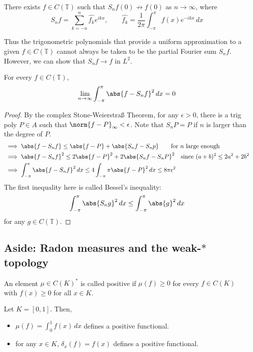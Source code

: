 \documentclass{article}
\begin{document}
\begin{eg}
    There exists $f \in C(\mathbb{T})$ such that $S_nf(0) \not\to f(0)$ as $n \to \infty$, where
    \begin{equation*}
        S_nf = \sum_{k = -n}^{n} \hat{f_k} e^{i k x}, \qquad \hat{f_k} = \frac{1}{2\pi} \int_{-\pi}^{\pi} f(x) e^{-i k x} \, dx
    \end{equation*}
\end{eg}

Thus the trigonometric polynomials that provide a uniform approximation to a given $f \in C(\mathbb{T})$ cannot always be taken to be the partial Fourier sum $S_nf$.
However, we can show that $S_nf \to f$ in $L^2$.
\begin{prop}
    For every $f \in C(\mathbb{T})$,
    \begin{equation*}
        \lim_{n \to \infty} \int_{-\pi}^\pi \abs{f - S_nf}^2 \, dx = 0
    \end{equation*}
\end{prop}
\begin{proof}
    By the complex Stone-Weierstra{\ss} Theorem, for any $\epsilon > 0$, there is a trig poly $P \in A$ such that $\norm{f-P}_\infty < \epsilon$.
    Note that $S_n P = P$ if $n$ is larger than the degree of $P$.
    \begin{align*}
        &\implies \abs{f - S_n f} \leq \abs{f - P} + \abs{S_n f - S_n p} \qquad \text{for $n$ large enough}\\
        &\implies \abs{f - S_n f}^2 \leq 2\abs{f - P}^2 + 2 \abs{S_n f - S_n P}^2 \quad \text{since } (a+b)^2 \leq 2a^2 + 2b^2 \\
        &\implies \int_{-\pi}^{\pi} \abs{f - S_n f}^2 \, dx \leq 4 \int_{-\pi}{\pi} \abs{f - P}^2 \, dx \leq 8 \pi \epsilon^2
    \end{align*}
    The first inequality here is called Bessel's inequality:
    \begin{equation*}
        \int_{-\pi}^\pi \abs{S_n g}^2 \, dx \leq \int_{-\pi}^\pi \abs{g}^2 \, dx
    \end{equation*}
    for any $g \in C(\mathbb{T})$.
\end{proof}

\subsection{Aside: Radon measures and the weak-$*$ topology}
\begin{defi}
    An element $\mu \in C(K)^*$ is called positive if $\mu(f) \geq 0$ for every $f \in C(K)$ with $f(x) \geq 0$ for all $x \in K$.
\end{defi}
\begin{eg}
    Let $K = [0, 1]$. Then,
    \begin{itemize}
        \item $\mu(f) = \int_0^1 f(x) \, dx$ defines a positive functional.
        \item for any $x \in K$, $\delta_x(f) = f(x)$ defines a positive functional.
    \end{itemize}
\end{eg}
\end{document}
